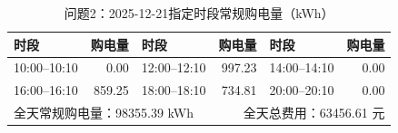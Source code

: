 \begin{table}[H]\centering\small
\caption{问题2：2025-12-21指定时段常规购电量（kWh）}
\label{tab:q2_1221_purchase}
\begin{tabular}{lrlrlr}\toprule
时段 & 购电量 & 时段 & 购电量 & 时段 & 购电量 \\\midrule
10:00--10:10 & 0.00 & 12:00--12:10 & 997.23 & 14:00--14:10 & 0.00 \\
16:00--16:10 & 859.25 & 18:00--18:10 & 734.81 & 20:00--20:10 & 0.00 \\
\midrule
\multicolumn{3}{l}{全天常规购电量：98355.39 kWh} & \multicolumn{3}{r}{全天总费用：63456.61 元}\\
\bottomrule\end{tabular}\end{table}
